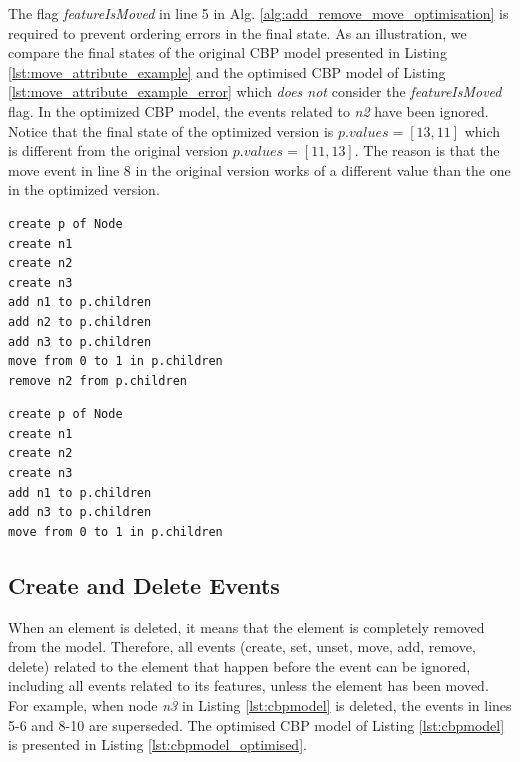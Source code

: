 \documentclass{llncs}
\begin{document}
The flag \emph{featureIsMoved} in line 5 in Alg. \ref{alg:add_remove_move_optimisation} is required to prevent ordering errors in the final state.
As an illustration, we compare the final states of the original CBP model presented in Listing  \ref{lst:move_attribute_example} and the optimised CBP model of Listing \ref{lst:move_attribute_example_error} which \emph{does not} consider the \emph{featureIsMoved} flag.
In the optimized CBP model, the events related to \emph{n2} have been ignored.
Notice that the final state of the optimized version is $p.values = [13, 11]$  which is different from the original version $p.values = [11,13]$.
The reason is that the move event in line 8 in the original version works of a different value than the one in the optimized version.

\noindent
\begin{minipage}[t]{0.48\linewidth}
\begin{lstlisting}[style=eol,caption={The CBP representation of reference \emph{children}'s move event.},label=lst:move_attribute_example]
create p of Node
create n1
create n2
create n3
add n1 to p.children
add n2 to p.children
add n3 to p.children
move from 0 to 1 in p.children
remove n2 from p.children
\end{lstlisting}
\end{minipage}
\hfill
\begin{minipage}[t]{0.48\linewidth}
\begin{lstlisting}[style=eol,caption={The optimised CBP representation of reference \emph{children}'s move event.},label=lst:move_attribute_example_error]
create p of Node
create n1
create n2
create n3
add n1 to p.children
add n3 to p.children
move from 0 to 1 in p.children
\end{lstlisting}
\end{minipage}


\subsection{Create and Delete Events}
\label{subsec:create_and_delete_operations}
When an element is deleted, it means that the element is completely removed from the model.
Therefore, all events (create, set, unset, move, add, remove, delete) related to the element that happen before the event can be ignored, including all events related to its features, unless the element has been moved.
For example, when node \emph{n3} in Listing \ref{lst:cbpmodel}  is deleted, the events in lines 5-6 and 8-10 are superseded.
The optimised CBP model of Listing \ref{lst:cbpmodel} is presented in Listing \ref{lst:cbpmodel_optimised}.
\end{document}
